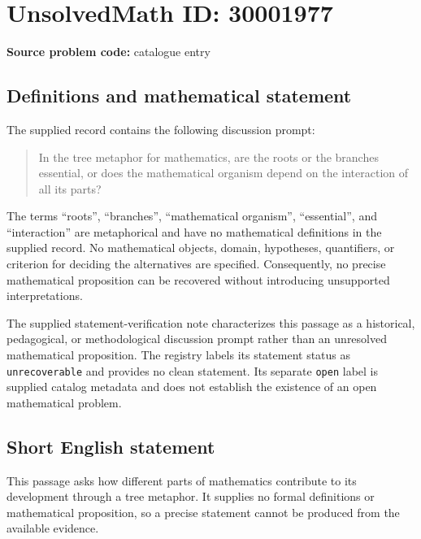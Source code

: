 \documentclass[11pt]{article}
\begin{document}
\section*{UnsolvedMath ID: 30001977}
\textbf{Source problem code:} catalogue entry
\subsection{Definitions and mathematical statement}
The supplied record contains the following discussion prompt:
\begin{quote}
In the tree metaphor for mathematics, are the roots or the branches essential, or does the mathematical organism depend on the interaction of all its parts?
\end{quote}
The terms ``roots'', ``branches'', ``mathematical organism'', ``essential'', and ``interaction'' are metaphorical and have no mathematical definitions in the supplied record. No mathematical objects, domain, hypotheses, quantifiers, or criterion for deciding the alternatives are specified. Consequently, no precise mathematical proposition can be recovered without introducing unsupported interpretations.

The supplied statement-verification note characterizes this passage as a historical, pedagogical, or methodological discussion prompt rather than an unresolved mathematical proposition. The registry labels its statement status as \texttt{unrecoverable} and provides no clean statement. Its separate \texttt{open} label is supplied catalog metadata and does not establish the existence of an open mathematical problem.
\subsection{Short English statement}
This passage asks how different parts of mathematics contribute to its development through a tree metaphor. It supplies no formal definitions or mathematical proposition, so a precise statement cannot be produced from the available evidence.
\end{document}
